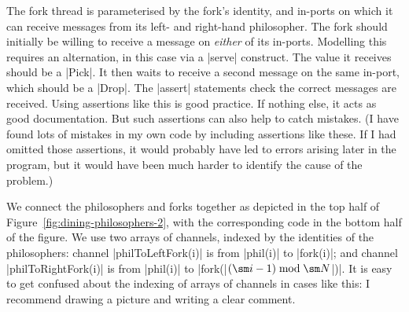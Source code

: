 The fork thread is parameterised by the fork's identity, and in-ports on which
it can receive messages from its left- and right-hand philosopher.  The fork
should initially be willing to receive a message on \emph{either} of its
in-ports.  Modelling this requires an alternation, in this case via a |serve|
construct.  The value it receives should be a |Pick|.  It then waits to
receive a second message on the same in-port, which should be a |Drop|.  The
|assert| statements check the correct messages are received.  Using assertions
like this is good practice.  If nothing else, it acts as good documentation.
But such assertions can also help to catch mistakes.  (I have found lots of
mistakes in my own code by including assertions like these.  If I had omitted
those assertions, it would probably have led to errors arising later in the
program, but it would have been much harder to identify the cause of the
problem.)

We connect the philosophers and forks together as depicted in the top half of
Figure~\ref{fig:dining-philosophers-2}, with the corresponding code in the
bottom half of the figure.  We use two arrays of channels, indexed by the
identities of the philosophers: channel |philToLeftFork(i)| is from |phil(i)|
to |fork(i)|; and channel |philToRightFork(i)| is from |phil(i)| to
|fork(|$(\sm i-1) \bmod \sm N$|)|.  It is easy to get confused about the
indexing of arrays of channels in cases like this: I recommend drawing a
picture and writing a clear comment.  



